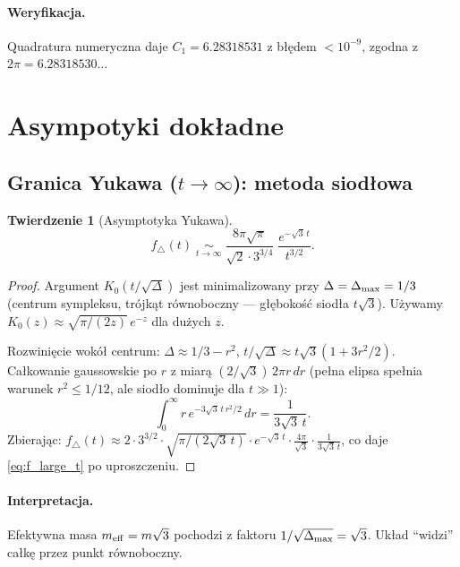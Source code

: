 \documentclass[11pt,a4paper]{article}
\newcommand{\Dt}{\Delta}
\newtheorem{theorem}{Twierdzenie}
\begin{document}
\paragraph{Weryfikacja.} Quadratura numeryczna daje $C_1=6.28318531$ z b\l{}\k{e}dem $<10^{-9}$, zgodna z $2\pi=6.28318530\ldots$

\section{Asympotyki dok\l{}adne}
\label{sec:asymptotics}

\subsection{Granica Yukawa ($t\to\infty$): metoda siod\l{}owa}

\begin{theorem}[Asymptotyka Yukawa]
\label{thm:large_t}
\begin{equation}
\label{eq:f_large_t}
\boxed{
f_\triangle(t) \;\underset{t\to\infty}{\sim}\;
\frac{8\pi\sqrt\pi}{\sqrt2\cdot 3^{3/4}}\;\frac{e^{-\sqrt3\,t}}{t^{3/2}}.
}
\end{equation}
\end{theorem}

\begin{proof}
Argument $K_0(t/\sqrt\Dt)$ jest minimalizowany przy $\Dt=\Dt_{\rm max}=1/3$
(centrum sympleksu, tr\'ojk\k{a}t r\'ownoboczny --- g\l{}\k{e}boko\'s\'c siod\l{}a $t\sqrt3$).
U\.{z}ywamy $K_0(z)\approx\sqrt{\pi/(2z)}\,e^{-z}$ dla du\.{z}ych $z$.

Rozwini\k{e}cie wok\'o\l{} centrum: $\Dt\approx1/3-r^2$, $t/\sqrt\Dt\approx t\sqrt3(1+3r^2/2)$.
Ca\l{}kowanie gaussowskie po $r$ z miar\k{a} $(2/\sqrt3)\,2\pi r\,dr$ (pe\l{}na elipsa
spe\l{}nia warunek $r^2\le1/12$, ale siod\l{}o dominuje dla $t\gg1$):
\[
\int_0^\infty r\,e^{-3\sqrt3\,t\,r^2/2}\,dr = \frac{1}{3\sqrt3\,t}.
\]
Zbieraj\k{a}c: $f_\triangle(t)
\approx 2\cdot3^{3/2}\cdot\sqrt{\pi/(2\sqrt3\,t)}\cdot e^{-\sqrt3\,t}
\cdot\frac{4\pi}{\sqrt3}\cdot\frac{1}{3\sqrt3\,t}$,
co daje \eqref{eq:f_large_t} po uproszczeniu.
\end{proof}

\paragraph{Interpretacja.} Efektywna masa $m_{\rm eff}=m\sqrt3$ pochodzi z faktoru
$1/\sqrt{\Dt_{\rm max}}=\sqrt3$. Uk\l{}ad ``widzi'' ca\l{}k\k{e} przez punkt r\'ownoboczny.
\end{document}
